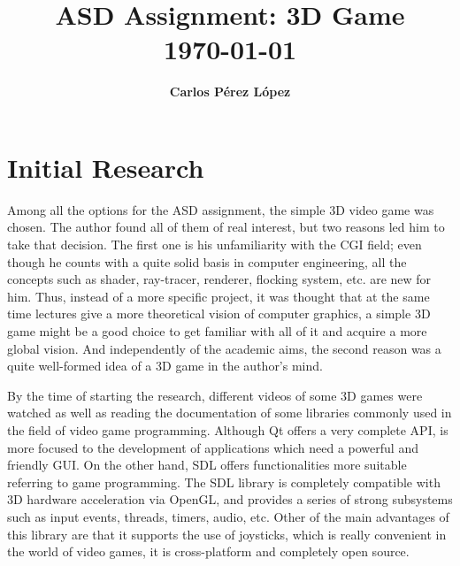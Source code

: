 \documentclass[]{article}
\title{
\vspace{2in}
\textmd{\textbf{ASD Assignment: 3D Game}}\\
\vspace{0.1in}
{\today}\\
\vspace{3in}
}
\author{\textbf{Carlos Pérez López}}
\date{}
\begin{document}
\maketitle %


\setlength\parindent{24pt} %

\renewcommand{\labelenumi}{\alph{enumi}.} %
\renewcommand{\cftsecleader}{\cftdotfill{\cftdotsep}}

\newpage
\tableofcontents
\newpage



\section{Initial Research}

Among all the options for the ASD assignment, the simple 3D video game was chosen. The author found all of them of real interest, but two reasons led him to take that decision. 
The first one is his unfamiliarity with the CGI field; even though he counts with a quite solid basis in computer engineering, all the concepts such as shader, ray-tracer, renderer, 
flocking system, etc. are new for him. Thus, instead of a more specific project, it was thought that at the same time lectures give a more theoretical vision of computer graphics, 
a simple 3D game might be a good choice to get familiar with all of it and acquire a more global vision. And independently of the academic aims, the second reason was a quite well-formed 
idea of a 3D game in the author's mind.

By the time of starting the research, different videos of some 3D games were watched as well as reading the documentation of some libraries commonly used in the field of 
video game programming. Although Qt offers a very complete API, is more focused to the development of applications which need a powerful and friendly GUI. On the other hand, SDL offers 
functionalities more suitable referring to game programming. The SDL library \cite{sdl} is completely compatible with 3D hardware acceleration via OpenGL, and provides a series of strong subsystems
 such as input events, threads, timers, audio, etc. Other of the main advantages of this library are that it supports the use of joysticks, which is really convenient in the world of video games,
 it is cross-platform and completely open source.
 
\end{document}
